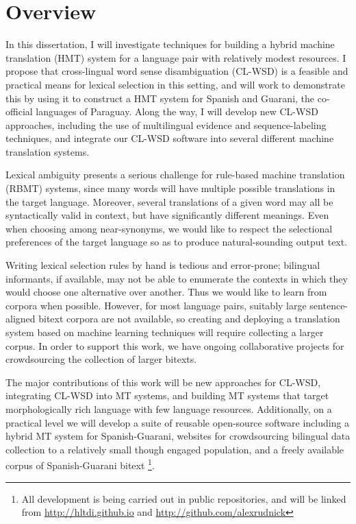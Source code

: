 \section{Overview}
In this dissertation, I will investigate techniques for building a hybrid
machine translation (HMT) system for a language pair with relatively modest
resources.
I propose that cross-lingual word sense disambiguation (CL-WSD) is a feasible
and practical means for lexical selection in this setting, and will work to
demonstrate this by using it to construct a HMT system for Spanish and Guarani,
the co-official languages of Paraguay.
Along the way, I will develop new CL-WSD approaches, including the use of
multilingual evidence and sequence-labeling techniques, and integrate our
CL-WSD software into several different machine translation systems.

Lexical ambiguity presents a serious challenge for rule-based machine
translation (RBMT) systems, since many words will have multiple possible
translations in the target language. Moreover, several translations of a given
word may all be syntactically valid in context, but have significantly
different meanings. Even when choosing among near-synonyms, we would like to
respect the selectional preferences of the target language so as to produce
natural-sounding output text.

Writing lexical selection rules by hand is tedious and error-prone; bilingual
informants, if available, may not be able to enumerate the contexts in which
they would choose one alternative over another. Thus we would like to learn
from corpora when possible. However, for most language pairs, suitably large
sentence-aligned bitext corpora are not available, so creating and deploying a
translation system based on machine learning techniques will require collecting
a larger corpus. In order to support this work, we have ongoing collaborative
projects for crowdsourcing the collection of larger bitexts.

The major contributions of this work will be new approaches for CL-WSD,
integrating CL-WSD into MT systems, and building MT systems that target
morphologically rich language with few language resources.  Additionally, on a
practical level we will develop a suite of reusable open-source software
including a hybrid MT system for Spanish-Guarani, websites for crowdsourcing
bilingual data collection to a relatively small though engaged population, and
a freely available corpus of Spanish-Guarani bitext
\footnote{All development is being carried out in public repositories, and will
be linked from \url{http://hltdi.github.io} and
\url{http://github.com/alexrudnick}}.

